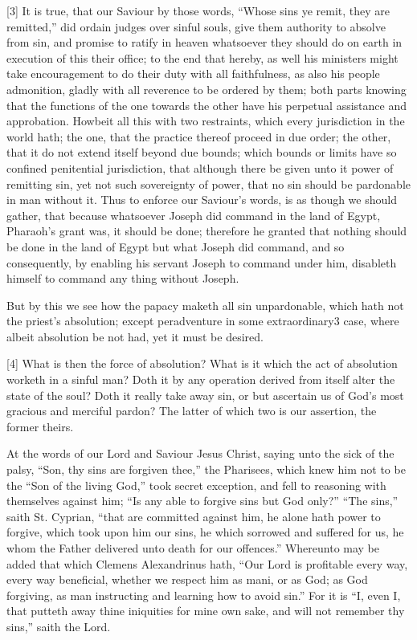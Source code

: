 [3] It is true, that our Saviour by those words, “Whose sins ye remit, they are remitted,” did ordain judges over sinful souls, give them authority to absolve from sin, and promise to ratify in heaven whatsoever they should do on earth in execution of this their office; to the end that hereby, as well his ministers might take encouragement to do their duty with all faithfulness, as also his people admonition, gladly with all reverence to be ordered by them; both parts knowing that the functions of the one towards the other have his perpetual assistance and approbation. Howbeit all this with two restraints, which every jurisdiction in the world hath; the one, that the practice thereof proceed in due order; the other, that it do not extend itself beyond due bounds; which bounds or limits have so confined penitential jurisdiction, that although there be given unto it power of remitting sin, yet not such sovereignty of power, that no sin should be pardonable in man without it. Thus to enforce our Saviour’s words, is as though we should gather, that because whatsoever Joseph did command in the land of Egypt, Pharaoh’s grant was, it should be done; therefore he granted that nothing should be done in the land of Egypt but what Joseph did command, and so consequently, by enabling his servant Joseph to command under him, disableth himself to command any thing without Joseph.

But by this we see how the papacy maketh all sin unpardonable, which hath not the priest’s absolution; except peradventure in some extraordinary3 case, where albeit absolution be not had, yet it must be desired.


[4] What is then the force of absolution? What is it which the act of absolution worketh in a sinful man? Doth it by any operation derived from itself alter the state of the soul? Doth it really take away sin, or but ascertain us of God’s most gracious and merciful pardon? The latter of which two is our assertion, the former theirs.

At the words of our Lord and Saviour Jesus Christ, saying unto the sick of the palsy, “Son, thy sins are forgiven thee,” the Pharisees, which knew him not to be the “Son of the living God,” took secret exception, and fell to reasoning with themselves against him; “Is any able to forgive sins but God only?” “The sins,” saith St. Cyprian, “that are committed against him, he alone hath power to forgive, which took upon him our sins, he which sorrowed and suffered for us, he whom the Father delivered unto death for our offences.” Whereunto may be added that which Clemens Alexandrinus hath, “Our Lord is profitable every way, every way beneficial, whether we respect him as mani, or as God; as God forgiving, as man instructing and learning how to avoid sin.” For it is “I, even I, that putteth away thine iniquities for mine own sake, and will not remember thy sins,” saith the Lord.

